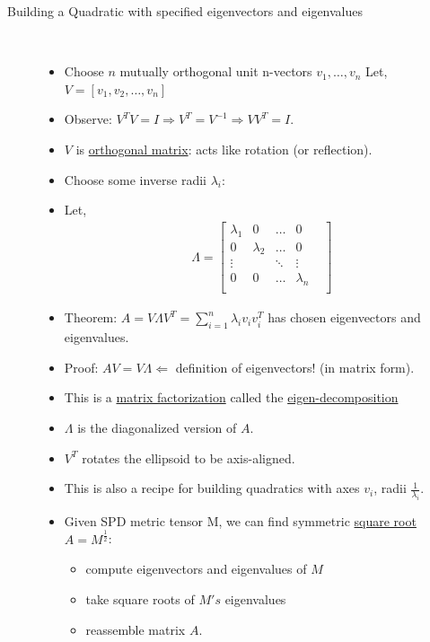 \documentclass[10pt]{article}
\begin{document}
\begin{description}
	\item[Building a Quadratic with specified eigenvectors and eigenvalues]
		\
		\begin{itemize}
			\item Choose $n$ mutually orthogonal unit n-vectors $v_{1}, \dots, v_{n}$ Let, $V = [v_{1}, v_{2}, \dots, v_{n}]$
			\item Observe: $V^{T}V = I \Rightarrow V^{T} = V^{-1} \Rightarrow VV^{T} = I$.
			\item $V$ is \underline{orthogonal matrix}: acts like rotation (or reflection).
			\item Choose some inverse radii $\lambda_{i}$:
			\item Let,
				\begin{align*}
					\Lambda =
						\begin{bmatrix}
							\lambda_{1} & 0 & \dots & 0\\
							0 & \lambda_{2} & \dots & 0\\
							\vdots & & \ddots & \vdots &\\
							0 & 0 & \dots & \lambda_{n}\\
						\end{bmatrix}
				\end{align*}
			\item Theorem: $A = V\Lambda V^{T} = \sum_{i=1}^{n} \lambda_{i} v_{i}v_{i}^T$ has chosen eigenvectors and eigenvalues.
			\item Proof: $AV = V\Lambda \Leftarrow$ definition of eigenvectors! (in matrix form).
			\item This is a \underline{matrix factorization} called the \underline{eigen-decomposition}
			\item $\Lambda$ is the diagonalized version of $A$.
			\item $V^{T}$ rotates the ellipsoid to be axis-aligned.
			\item This is also a recipe for building quadratics with axes $v_{i}$, radii $\frac{1}{\lambda_{i}}$.
			\item Given SPD metric tensor M, we can find symmetric \underline{square root} $A = M^{\frac{1}{2}}$:
				\begin{itemize}
					\item compute eigenvectors and eigenvalues of $M$
					\item take square roots of $M's$ eigenvalues
					\item reassemble matrix $A$.
				\end{itemize}
		\end{itemize}
\end{description}
\newpage
\end{document}
